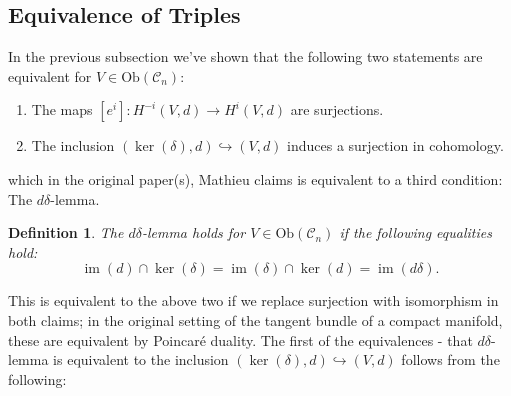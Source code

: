 \documentclass{amsart}
\newcommand{\ra}{\rightarrow}
\newtheorem{definition}[theorem]{Definition}
\theoremstyle{definition}
\DeclareMathOperator{\im}{im}
\begin{document}
\subsection{Equivalence of Triples}
In the previous subsection we've shown that the following two statements are equivalent for $V \in \mathrm{Ob}(\mathscr{C}_n)$:
\begin{enumerate}
    \item The maps $[e^i]:H^{-i}(V,d) \ra H^i(V,d)$ are surjections.
    \item The inclusion $(\ker(\delta),d) \hookrightarrow (V,d)$ induces a surjection in cohomology.
\end{enumerate}
which in the original paper(s), Mathieu claims is equivalent to a third condition: The $d\delta$-lemma. 
\begin{definition}
    The $d \delta$-lemma holds for $V \in \mathrm{Ob}(\mathscr{C}_n)$ if the following equalities hold:
    \begin{equation*}
        \im(d) \cap \ker(\delta) = \im(\delta) \cap \ker(d)= \im (d \delta).
    \end{equation*}
\end{definition}
This is equivalent to the above two if we replace surjection with isomorphism in both claims; in the original setting of the tangent bundle of a compact manifold, these are equivalent by Poincaré duality. The first of the equivalences - that $d\delta$-lemma is equivalent to the inclusion $(\ker(\delta),d) \hookrightarrow (V, d)$ follows from the following:
\end{document}
